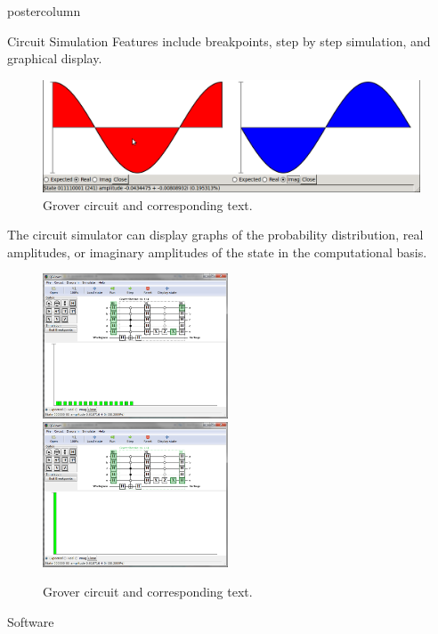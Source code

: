 \documentclass[final]{beamer} %
\begin{document}
\begin{frame}{}
\begin{columns}
\begin{column}{.33\textwidth}
\begin{beamercolorbox}[center,wd=\textwidth]{postercolumn}
\begin{minipage}[c][0.95\textheight][s]{0.95\columnwidth}
\begin{block}{\large Circuit Simulation}
                Features include breakpoints, step by step simulation, and graphical display.
		        \begin{figure}[!htbp]
		            \centering
		            \includegraphics[width=\textwidth]{figures/state.png}
		            \caption{Grover circuit and corresponding text.}
		        \end{figure}
                The circuit simulator can display graphs of the probability
                distribution, real amplitudes, or imaginary amplitudes of the
                state in the computational basis.
                \vspace*{0.5em}
            \begin{figure}[!htbp]
		            \centering
		            \includegraphics[width=0.49\textwidth]{figures/Grover_Simulate1.png} \ \  \includegraphics[width=0.49\textwidth]{figures/Grover_Simulate2.png}
		            \caption{Grover circuit and corresponding text.}
		        \end{figure}
            \end{block}
            \vfill
            \begin{block}{\large Software}

\end{block}
\end{minipage}
\end{beamercolorbox}
\end{column}
\end{columns}
\end{frame}
\end{document}
